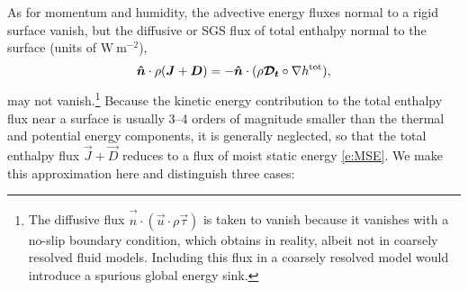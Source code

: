 \documentclass{report}
\begin{document}
As for momentum and humidity, the advective energy fluxes normal to a rigid surface vanish, but the diffusive or SGS flux of total enthalpy normal to the surface (units of $\mathrm{W~m^{-2}}$),
\[
\boldsymbol{{\hat n}} \cdot \rho (\boldsymbol{{J}} + \boldsymbol{{D}}) = -\boldsymbol{{\hat n}} \cdot (\rho \boldsymbol{{\mathcal{D}_t}} \circ \nabla h^{\mathrm{tot}}),
\]
may not vanish.\footnote{The diffusive flux $\vec{\hat n} \cdot (\vec{u} \cdot \rho\vec{\tau})$ is taken to vanish because it vanishes with a no-slip boundary condition, which obtains in reality, albeit not in coarsely resolved fluid models. Including this flux in a coarsely resolved model would introduce a spurious global energy sink.} Because the kinetic energy contribution to the total enthalpy flux near a surface is usually 3--4 orders of magnitude smaller than the thermal and potential energy components, it is generally neglected, so that the total enthalpy flux $\vec{J} + \vec{D}$ reduces to a flux of moist static energy \eqref{e:MSE}. We make this approximation here and distinguish three cases:
\end{document}
